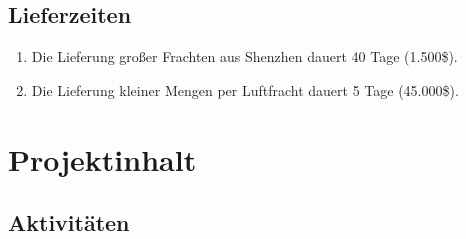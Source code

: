 \subsection{Lieferzeiten}
\begin{enumerate}
    \item Die Lieferung großer Frachten aus Shenzhen dauert 40 Tage (1.500\$).
    \item Die Lieferung kleiner Mengen per Luftfracht dauert 5 Tage (45.000\$).
\end{enumerate}

\section{Projektinhalt}
\subsection{Aktivitäten}
